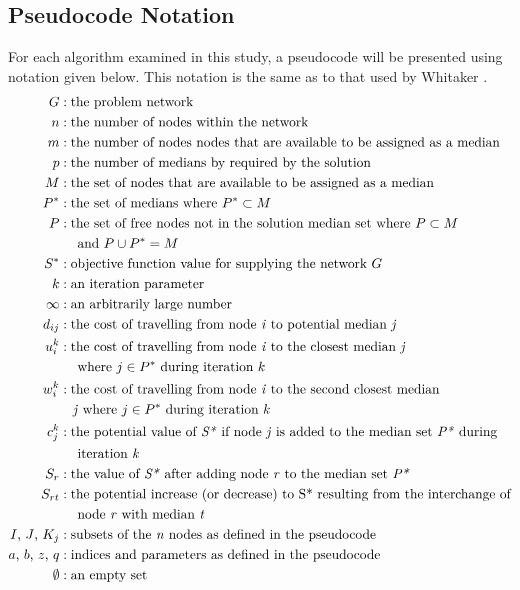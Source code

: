 \documentclass[11pt]{article}
\begin{document}
	\subsection{Pseudocode Notation} \label{pseudocode.notation}
	For each algorithm examined in this study, a pseudocode will be presented using notation given below.  This notation is the same as to that used by Whitaker \cite{WHIT83}.
	\begin{align*}
	G &: \text{the problem network}\\
	n &: \text{the number of nodes within the network}\\
	m &: \text{the number of nodes nodes that are available to be assigned as a median}\\
	p &: \text{the number of medians by required by the solution}\\
	M &: \text{the set of nodes that are available to be assigned as a median}\\
	P^{*} &: \text{the set of medians where } P^{*} \subset M\\
	P &: \text{the set of free nodes not in the solution median set where } P \subset M\\
			& \quad \text{ and } P \cup P^{*} = M\\
	S^{*} &: \text{objective function value for supplying the network } G\\
	k &: \text{an iteration parameter}\\
	\infty &: \text{an arbitrarily large number}\\
	d_{ij} &: \text{the cost of travelling from node \emph{i} to potential median \emph{j}}\\
	u_{i}^{k} &: \text{the cost of travelling from node \emph{i} to the closest median \emph{j}}\\
			& \quad \text{ where } j \in P^{*} \text{ during iteration } k\\
	w_{i}^{k} &: \text{the cost of travelling from node \emph{i} to the second closest median}\\
			& \quad \text{\emph{j} where } j \in P^{*} \text{ during iteration } k\\
	c_{j}^{k} &: \text{the potential value of \emph{S*} if node \emph{j} is added to the median set \emph{P*} during}\\
			& \quad \text{ iteration \emph{k}}\\
	S_{r} &: \text{the value of \emph{S*} after adding node \emph{r} to the median set \emph{P*}}\\
	S_{rt} &: \text{the potential increase (or decrease) to S* resulting from the interchange of}\\
			& \quad \text{ node \emph{r} with median \emph{t}}\\
	I \text{, } J \text{, } K_{j} &: \text{subsets of the \emph{n} nodes as defined in the pseudocode}\\
	a \text{, } b \text{, } z \text{, } q &: \text{indices and parameters as defined in the pseudocode}\\
	\emptyset &: \text{an empty set}	
	\end{align*}
	
\end{document}
